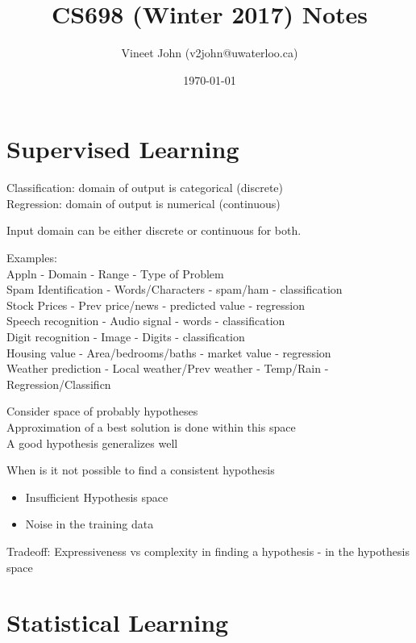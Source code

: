 \documentclass[parskip=half]{scrartcl}
\begin{document}
\title{CS698 (Winter 2017) Notes}
\author{Vineet John (v2john@uwaterloo.ca)}
\date{\today}
\maketitle

\section{Supervised Learning}\label{supervised-learning}

    Classification: domain of output is categorical (discrete)\\
    Regression: domain of output is numerical (continuous)

    Input domain can be either discrete or continuous for both.

    Examples:\\
    Appln - Domain - Range - Type of Problem\\
    Spam Identification - Words/Characters - spam/ham - classification\\
    Stock Prices - Prev price/news - predicted value - regression\\
    Speech recognition - Audio signal - words - classification\\
    Digit recognition - Image - Digits - classification\\
    Housing value - Area/bedrooms/baths - market value - regression\\
    Weather prediction - Local weather/Prev weather - Temp/Rain - Regression/Classificn

    Consider space of probably hypotheses\\
    Approximation of a best solution is done within this space\\
    A good hypothesis generalizes well

    When is it not possible to find a consistent hypothesis

    \begin{itemize}
        \item
        Insufficient Hypothesis space
        \item
        Noise in the training data
    \end{itemize}

    Tradeoff: Expressiveness vs complexity in finding a hypothesis - in the
    hypothesis space

\section{Statistical Learning}\label{statistical-learning}
\end{document}
